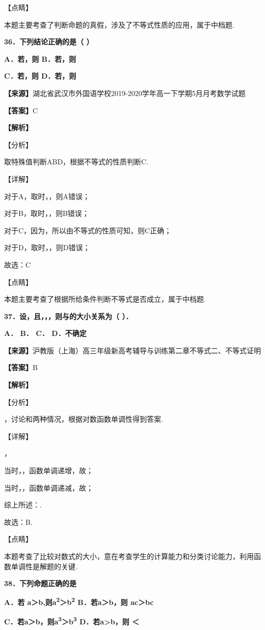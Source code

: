 \documentclass[
]{article}
\begin{document}
【点睛】

本题主要考查了判断命题的真假，涉及了不等式性质的应用，属于中档题.

\textbf{36．下列结论正确的是（ ）}

\textbf{A．若，则 B．若，则}

\textbf{C．若，则 D．若，则}

\textbf{【来源】}湖北省武汉市外国语学校2019-2020学年高一下学期5月月考数学试题

\textbf{【答案】}C

\textbf{【解析】}

【分析】

取特殊值判断ABD，根据不等式的性质判断C.

【详解】

对于A，取时，，则A错误；

对于B，取时，，则B错误；

对于C，因为，所以由不等式的性质可知，则C正确；

对于D，取时，，则D错误；

故选：C

【点睛】

本题主要考查了根据所给条件判断不等式是否成立，属于中档题.

\textbf{37．设，且，，，则与的大小关系为（ ）．}

\textbf{A． B． C． D．不确定}

\textbf{【来源】}沪教版（上海）高三年级新高考辅导与训练第二章不等式二、不等式证明

\textbf{【答案】}B

\textbf{【解析】}

【分析】

，讨论和两种情况，根据对数函数单调性得到答案.

【详解】

，

当时，，函数单调递增，故；

当时，，函数单调递减，故；

综上所述：.

故选：B.

【点睛】

本题考查了比较对数式的大小，意在考查学生的计算能力和分类讨论能力，利用函数单调性是解题的关键.

\textbf{38．下列命题正确的是}

\textbf{A．若 a＞b,则a\textsuperscript{2}＞b\textsuperscript{2}
B．若a＞b，则 ac＞bc}

\textbf{C．若a＞b，则a\textsuperscript{3}＞b\textsuperscript{3}
D．若a\textgreater b，则 ＜}
\end{document}
